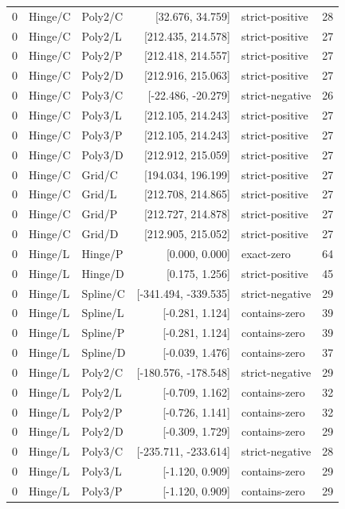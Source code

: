 \begin{longtable}{lllrlr}
0 & Hinge/C & Poly2/C & [32.676, 34.759] & strict-positive & 28 \\
0 & Hinge/C & Poly2/L & [212.435, 214.578] & strict-positive & 27 \\
0 & Hinge/C & Poly2/P & [212.418, 214.557] & strict-positive & 27 \\
0 & Hinge/C & Poly2/D & [212.916, 215.063] & strict-positive & 27 \\
0 & Hinge/C & Poly3/C & [-22.486, -20.279] & strict-negative & 26 \\
0 & Hinge/C & Poly3/L & [212.105, 214.243] & strict-positive & 27 \\
0 & Hinge/C & Poly3/P & [212.105, 214.243] & strict-positive & 27 \\
0 & Hinge/C & Poly3/D & [212.912, 215.059] & strict-positive & 27 \\
0 & Hinge/C & Grid/C & [194.034, 196.199] & strict-positive & 27 \\
0 & Hinge/C & Grid/L & [212.708, 214.865] & strict-positive & 27 \\
0 & Hinge/C & Grid/P & [212.727, 214.878] & strict-positive & 27 \\
0 & Hinge/C & Grid/D & [212.905, 215.052] & strict-positive & 27 \\
0 & Hinge/L & Hinge/P & [0.000, 0.000] & exact-zero & 64 \\
0 & Hinge/L & Hinge/D & [0.175, 1.256] & strict-positive & 45 \\
0 & Hinge/L & Spline/C & [-341.494, -339.535] & strict-negative & 29 \\
0 & Hinge/L & Spline/L & [-0.281, 1.124] & contains-zero & 39 \\
0 & Hinge/L & Spline/P & [-0.281, 1.124] & contains-zero & 39 \\
0 & Hinge/L & Spline/D & [-0.039, 1.476] & contains-zero & 37 \\
0 & Hinge/L & Poly2/C & [-180.576, -178.548] & strict-negative & 29 \\
0 & Hinge/L & Poly2/L & [-0.709, 1.162] & contains-zero & 32 \\
0 & Hinge/L & Poly2/P & [-0.726, 1.141] & contains-zero & 32 \\
0 & Hinge/L & Poly2/D & [-0.309, 1.729] & contains-zero & 29 \\
0 & Hinge/L & Poly3/C & [-235.711, -233.614] & strict-negative & 28 \\
0 & Hinge/L & Poly3/L & [-1.120, 0.909] & contains-zero & 29 \\
0 & Hinge/L & Poly3/P & [-1.120, 0.909] & contains-zero & 29 \\

\end{longtable}
